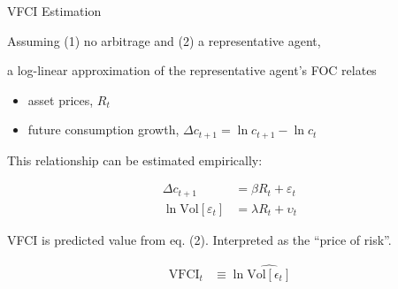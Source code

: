 \begin{frame}{VFCI Estimation}
  \label{vfci_estimation}
  
  \vspace{0.3cm}
  Assuming (1) no arbitrage and (2) a representative agent,
  
  a log-linear approximation of the representative agent's FOC relates
  \begin{itemize}
    \item asset prices, $R_t$
    \item future consumption growth, $\Delta c_{t+1} = \ln c_{t+1} - \ln c_t$
  \end{itemize}

  This relationship can be estimated empirically:

  \vspace{-1cm}
  \begin{align}
    \Delta c_{t+1} &= \beta R_t + \varepsilon_t
    \\
    \ln \text{Vol}[\varepsilon_t] &= \lambda R_t + \upsilon_t
  \end{align}

  VFCI is predicted value from eq. (2). Interpreted as the ``price of risk''.

  \vspace{-1cm}
  \setcounter{equation}{0}
  \begin{align*}
    \text{VFCI}_t &\equiv \ln \widehat{\text{Vol}[\epsilon_t]}
  \end{align*}

\end{frame}

